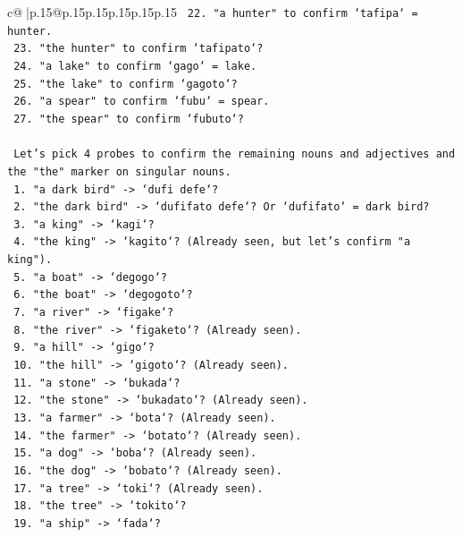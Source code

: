 \documentclass{article}
\begin{document}
{\begin{supertabular}{c@{$\;$}|p{.15\linewidth}@{}p{.15\linewidth}p{.15\linewidth}p{.15\linewidth}p{.15\linewidth}p{.15\linewidth}}
{{{\texttt{    22. "a hunter" to confirm `tafipa` = hunter.} \\
\texttt{    23. "the hunter" to confirm `tafipato`?} \\
\texttt{    24. "a lake" to confirm `gago` = lake.} \\
\texttt{    25. "the lake" to confirm `gagoto`?} \\
\texttt{    26. "a spear" to confirm `fubu` = spear.} \\
\texttt{    27. "the spear" to confirm `fubuto`?} \\
\\ 
\texttt{    Let's pick 4 probes to confirm the remaining nouns and adjectives and the "the" marker on singular nouns.} \\
\texttt{    1. "a dark bird" {-}> `dufi defe`?} \\
\texttt{    2. "the dark bird" {-}> `dufifato defe`? Or `dufifato` = dark bird?} \\
\texttt{    3. "a king" {-}> `kagi`?} \\
\texttt{    4. "the king" {-}> `kagito`? (Already seen, but let's confirm "a king").} \\
\texttt{    5. "a boat" {-}> `degogo`?} \\
\texttt{    6. "the boat" {-}> `degogoto`?} \\
\texttt{    7. "a river" {-}> `figake`?} \\
\texttt{    8. "the river" {-}> `figaketo`? (Already seen).} \\
\texttt{    9. "a hill" {-}> `gigo`?} \\
\texttt{    10. "the hill" {-}> `gigoto`? (Already seen).} \\
\texttt{    11. "a stone" {-}> `bukada`?} \\
\texttt{    12. "the stone" {-}> `bukadato`? (Already seen).} \\
\texttt{    13. "a farmer" {-}> `bota`? (Already seen).} \\
\texttt{    14. "the farmer" {-}> `botato`? (Already seen).} \\
\texttt{    15. "a dog" {-}> `boba`? (Already seen).} \\
\texttt{    16. "the dog" {-}> `bobato`? (Already seen).} \\
\texttt{    17. "a tree" {-}> `toki`? (Already seen).} \\
\texttt{    18. "the tree" {-}> `tokito`?} \\
\texttt{    19. "a ship" {-}> `fada`?} \\
}}}
\end{supertabular}}
\end{document}

